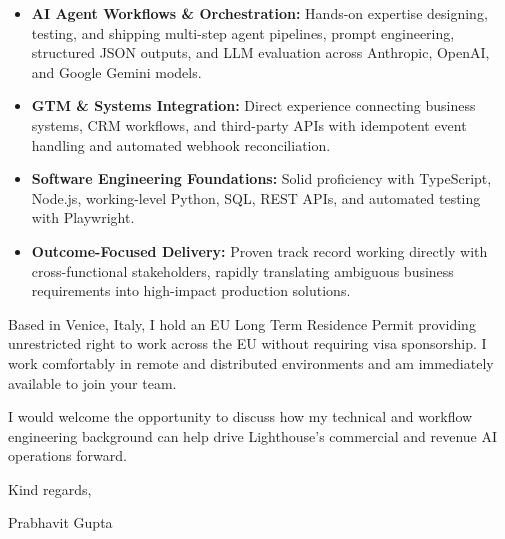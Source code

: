 \documentclass[11pt,a4paper]{article}
\begin{document}
\begin{itemize}[leftmargin=*]
    \item \textbf{AI Agent Workflows \& Orchestration:} Hands-on expertise designing, testing, and shipping multi-step agent pipelines, prompt engineering, structured JSON outputs, and LLM evaluation across Anthropic, OpenAI, and Google Gemini models.
    \item \textbf{GTM \& Systems Integration:} Direct experience connecting business systems, CRM workflows, and third-party APIs with idempotent event handling and automated webhook reconciliation.
    \item \textbf{Software Engineering Foundations:} Solid proficiency with TypeScript, Node.js, working-level Python, SQL, REST APIs, and automated testing with Playwright.
    \item \textbf{Outcome-Focused Delivery:} Proven track record working directly with cross-functional stakeholders, rapidly translating ambiguous business requirements into high-impact production solutions.
\end{itemize}

\noindent Based in Venice, Italy, I hold an EU Long Term Residence Permit providing unrestricted right to work across the EU without requiring visa sponsorship. I work comfortably in remote and distributed environments and am immediately available to join your team.

\noindent I would welcome the opportunity to discuss how my technical and workflow engineering background can help drive Lighthouse's commercial and revenue AI operations forward.

\vspace{8pt}

\noindent Kind regards,

\vspace{8pt}

\noindent Prabhavit Gupta
\end{document}
